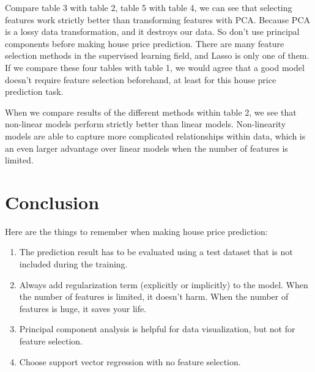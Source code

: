 \documentclass[a4paper]{article}
\begin{document}
Compare table 3 with table 2, table 5 with table 4, we can see that selecting features work strictly better than transforming features with PCA. Because PCA is a lossy data transformation, and it destroys our data. So don't use principal components before making house price prediction. There are many feature selection methods in the supervised learning field, and Lasso is only one of them. If we compare these four tables with table 1, we would agree that a good model doesn't require feature selection beforehand, at least for this house price prediction task.

When we compare results of the different methods within table 2, we see that non-linear models perform strictly better than linear models. Non-linearity models are able to capture more complicated relationships within data, which is an even larger advantage over linear models when the number of features is limited.

\section{Conclusion}
Here are the things to remember when making house price prediction:
\begin{enumerate}
  \item The prediction result has to be evaluated using a test dataset that is not included during the training.
  \item Always add regularization term (explicitly or implicitly) to the model. When the number of features is limited, it doesn't harm. When the number of features is huge, it saves your life.
  \item Principal component analysis is helpful for data visualization, but not for feature selection.
  \item Choose support vector regression with no feature selection.
\end{enumerate}





\end{document}
